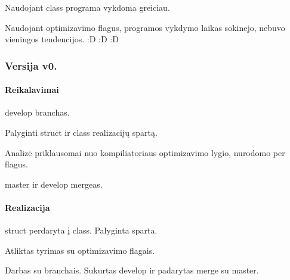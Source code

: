 \begin{DoxyItemize}
\item Naudojant class programa vykdoma greiciau.
\item Naudojant optimizavimo flag\textquotesingle{}us, programos vykdymo laikas sokinejo, nebuvo vieningos tendencijos. \+:D \+:D \+:D
\end{DoxyItemize}

\subsubsection*{Versija v0.}

\paragraph*{Reikalavimai}


\begin{DoxyEnumerate}
\item {\ttfamily develop} branch\textquotesingle{}as.
\item Palyginti {\ttfamily struct} ir {\ttfamily class} realizacijų spartą.
\item Analizė priklausomai nuo kompiliatoriaus optimizavimo lygio, nurodomo per flag\textquotesingle{}us.
\item {\ttfamily master} ir {\ttfamily develop} merge\textquotesingle{}as.
\end{DoxyEnumerate}

\paragraph*{Realizacija}


\begin{DoxyEnumerate}
\item {\ttfamily struct} perdaryta į {\ttfamily class}. Palyginta sparta.
\item Atliktas tyrimas su optimizavimo flag\textquotesingle{}ais.
\item Darbas su branch\textquotesingle{}ais. Sukurtas {\ttfamily develop} ir padarytas merge su {\ttfamily master}. 
\end{DoxyEnumerate}